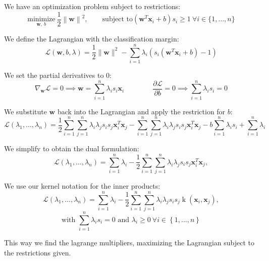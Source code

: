 We have an optimization problem subject to restrictions:
\begin{equation*}
    \underset{\bm w,\ b}{\text{minimize}} \ \frac{1}{2}\left\| \bm w \right\| ^2,\qquad
    \text{subject to} \left( \bm w^T \bm{x}_i + b \right) s_i\ge 1 \ \forall i \in\{1,\dots,n\}
\end{equation*}

We define the Lagrangian with the classification margin:
\begin{equation*}
\mathcal{L}(\bm{w}, b, \lambda) = \frac{1}{2} \|\bm{w}\|^2 - \sum_{i=1}^n \lambda_i (s_i(\bm{w}^T \bm{x}_i + b) - 1)
\end{equation*}

We set the partial derivatives to 0:
\begin{equation*}
\nabla_{\bm{w}} \mathcal{L} = 0 \implies \bm{w} = \sum_{i=1}^n \lambda_i s_i \bm{x}_i
\qquad\qquad
\frac{\partial \mathcal{L}}{\partial b} = 0 \implies \sum_{i=1}^n \lambda_i s_i = 0
\end{equation*}

We substitute $\bm{w}$ back into the Lagrangian and apply the restriction for $b$:
\begin{equation*}
\mathcal{L}(\lambda_1,\dots,\lambda_n) = \frac{1}{2} \sum_{i=1}^n \sum_{j=1}^n \lambda_i \lambda_j s_i s_j \bm{x}_i^T \bm{x}_j - \sum_{i=1}^n \sum_{j=1}^n \lambda_i \lambda_j s_i s_j \bm{x}_i^T \bm{x}_j - b \sum_{i=1}^n \lambda_i s_i + \sum_{i=1}^n \lambda_i
\end{equation*}

We simplify  to obtain the dual formulation:
\begin{equation*}
\mathcal{L}(\lambda_1,\dots,\lambda_n) = \sum_{i=1}^n \lambda_i - \frac{1}{2} \sum_{i=1}^n \sum_{j=1}^n \lambda_i \lambda_j s_i s_j \bm{x}_i^T \bm{x}_j,
\end{equation*}

We use our kernel notation for the inner products:
\begin{equation*}
\mathcal{L}(\lambda_1,\dots,\lambda_n) = \sum_{i=1}^n \lambda_i - \frac{1}{2} \sum_{i=1}^n \sum_{j=1}^n \lambda_i \lambda_j s_i s_j \operatorname{k}(\textbf{x}_i, \textbf{x}_j),
\end{equation*}
\begin{equation*}
    \text{with } \sum_{i=1}^n \lambda_i s_i = 0 \text{ and } \lambda_i\ge0\ \forall i\in \left\{ 1,\dots,n \right\} 
\end{equation*}

This way we find the lagrange multipliers, maximizing the Lagrangian subject to the restrictions given.

